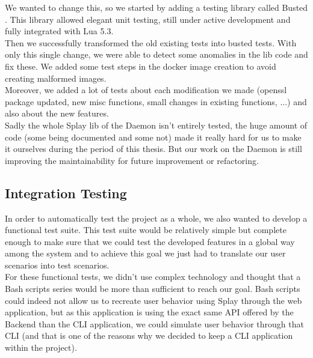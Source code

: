 \documentclass{eplmastersthesis}
\begin{document}
        We wanted to change this, so we started by adding a testing library
        called Busted \cite{busted}. This library allowed elegant unit testing,
        still under active development and fully integrated with Lua 5.3.\\
        Then we successfully transformed the old existing tests into busted
        tests. With only this single change, we were able to detect some
        anomalies in the lib code and fix these. We added some test steps
        in the docker image creation to avoid creating malformed images.\\

        Moreover, we added a lot of tests about each modification we made
        (openssl package updated, new misc functions, small changes in existing
        functions, ...) and also about the new features.\\
        Sadly the whole Splay lib of the Daemon isn't entirely tested,
        the huge amount of code (some being documented and some not) made it
        really hard for us to make it ourselves during the period of this
        thesis. But our work on the Daemon is still improving the maintainability
        for future improvement or refactoring.

      \subsection{Integration Testing}

        In order to automatically test the project as a whole, we also wanted to
        develop a functional test suite. This test suite would be relatively
        simple but complete enough to make sure that we could test the developed
        features in a global way among the system and to achieve this goal we
        just had to translate our user scenarios into test scenarios.\\

        For these functional tests, we didn't use complex technology and
        thought that a Bash scripts series would be more than sufficient to
        reach our goal. Bash scripts could indeed not allow us to recreate user
        behavior using Splay through the web application, but as this
        application is using the exact same API offered by the Backend than the
        CLI application, we could simulate user behavior through that CLI (and
        that is one of the reasons why we decided to keep a CLI application
        within the project).\\
\end{document}
